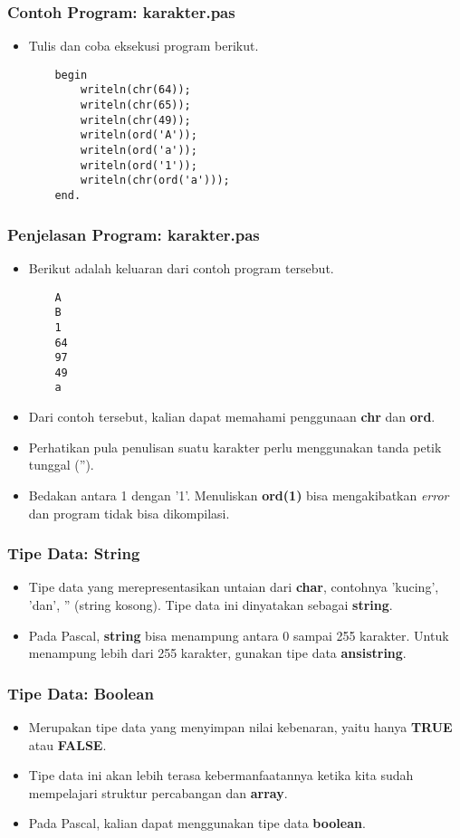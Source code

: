 \documentclass{beamer}
\begin{document}
\begin{frame}[fragile]
\frametitle{Contoh Program: karakter.pas}
\begin{itemize}
	\item Tulis dan coba eksekusi program berikut.
	\begin{lstlisting}
	begin
	    writeln(chr(64));
	    writeln(chr(65));
	    writeln(chr(49));
	    writeln(ord('A'));
	    writeln(ord('a'));
	    writeln(ord('1'));
	    writeln(chr(ord('a')));
	end.
	\end{lstlisting}
\end{itemize}
\end{frame}

\begin{frame}[fragile]
\frametitle{Penjelasan Program: karakter.pas}
\begin{itemize}
	\item Berikut adalah keluaran dari contoh program tersebut.
	\begin{lstlisting}
	A
	B
	1
	64
	97
	49
	a
	\end{lstlisting}
	\item Dari contoh tersebut, kalian dapat memahami penggunaan \textbf{chr} dan \textbf{ord}.
	\item Perhatikan pula penulisan suatu karakter perlu menggunakan tanda petik tunggal ('').
	\item Bedakan antara 1 dengan '1'. Menuliskan \textbf{ord(1)} bisa mengakibatkan \textit{error} dan program tidak bisa dikompilasi.
\end{itemize}
\end{frame}

\begin{frame}
\frametitle{Tipe Data: String}
\begin{itemize}
	\item Tipe data yang merepresentasikan untaian dari \textbf{char}, contohnya 'kucing', 'dan', '' (string kosong). Tipe data ini dinyatakan sebagai \alert{\textbf{string}}.
	\item Pada Pascal, \textbf{string} bisa menampung antara 0 sampai 255 karakter. Untuk menampung lebih dari 255 karakter, gunakan tipe data \alert{\textbf{ansistring}}.
\end{itemize}
\end{frame}

\begin{frame}
\frametitle{Tipe Data: Boolean}
\begin{itemize}
	\item Merupakan tipe data yang menyimpan nilai kebenaran, yaitu hanya \textbf{TRUE} atau \textbf{FALSE}.
	\item Tipe data ini akan lebih terasa kebermanfaatannya ketika kita sudah mempelajari struktur percabangan dan \textbf{array}.
	\item Pada Pascal, kalian dapat menggunakan tipe data \alert{\textbf{boolean}}.
\end{itemize}
\end{frame}
\end{document}
